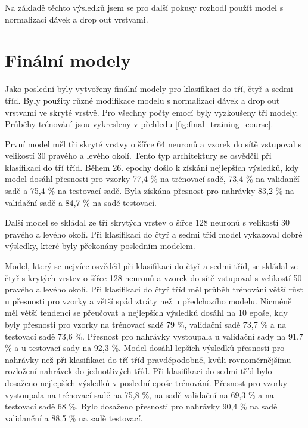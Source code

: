 \documentclass[FM,BP]{tulthesis}
\begin{document}
Na základě těchto výsledků jsem se pro další pokusy rozhodl použít model s normalizací dávek a drop out vrstvami.

\section{Finální modely}
Jako poslední byly vytvořeny finální modely pro klasifikaci do tří, čtyř a sedmi tříd. Byly použity různé modifikace modelu s normalizací dávek a drop out vrstvami ve skryté vrstvě. Pro všechny počty emocí byly vyzkoušeny tři modely. Průběhy trénování jsou vykresleny v přehledu \ref{fig:final_training_course}.

První model měl tři skryté vrstvy o šířce 64 neuronů a vzorek do sítě vstupoval s velikostí 30 pravého a levého okolí. Tento typ architektury se osvědčil při klasifikaci do tří tříd. Během 26. epochy došlo k získání nejlepších výsledků, kdy model dosáhl přesnosti pro vzorky 77,4 \% na trénovací sadě, 73,4 \% na validančí sadě a 75,4 \% na testovací sadě. Byla získána přesnost pro nahrávky 83,2 \% na validační sadě a 84,7 \% na sadě testovací.

Další model se skládal ze tří skrytých vrstev o šířce 128 neuronů s velikostí 30 pravého a levého okolí. Při klasifikaci do čtyř a sedmi tříd model vykazoval dobré výsledky, které byly překonány posledním modelem.

Model, který se nejvíce osvědčil při klasifikaci do čtyř a sedmi tříd, se skládal ze čtyř s krytých vrstev o šířce 128 neuronů a vzorek do sítě vstupoval s velikostí 50 pravého a levého okolí. Při klasifikaci do čtyř tříd měl průběh trénování větší růst u přesnosti pro vzorky a větší spád ztráty než u předchozího modelu. Nicméně měl větší tendenci se přeučovat a nejlepších výsledků dosáhl na 10 epoše, kdy byly přesnosti pro vzorky na trénovací sadě 79 \%, validační sadě 73,7 \% a na testovací sadě 73,6 \%. Přesnost pro nahrávky vystoupala u validační sady na 91,7 \% a u testovací sady na 92,3 \%. Model dosáhl lepších výsledků přesnosti pro nahrávky než při klasifikaci do tří tříd pravděpodobně, kvůli rovnoměrnějšímu rozložení nahrávek do jednotlivých tříd. Při klasifikaci do sedmi tříd bylo dosaženo nejlepších výsledků v poslední epoše trénování. Přesnost pro vzorky vystoupala na trénovací sadě na 75,8 \%, na sadě validační na 69,3 \% a na testovací sadě 68 \%. Bylo dosaženo přesnosti pro nahrávky 90,4 \% na sadě validanční a 88,5 \% na sadě testovací.
\end{document}
